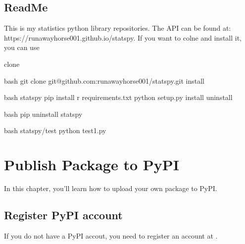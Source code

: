 \documentclass[letterpaper,12pt,english]{sphinxmanual}
\begin{document}
\section{ReadMe}
\label{\detokenize{pack:readme}}
\begin{sphinxVerbatim}[commandchars=\\\{\}]

This is my statistics python library repositories.
The API can be found at: https://runawayhorse001.github.io/statspy.
If you want to colne and install it, you can use

\PYGZhy{} clone

bash
git clone git@github.com:runawayhorse001/statspy.git
\PYGZhy{} install

bash
 statspy
pip install \PYGZhy{}r requirements.txt
python setup.py install
\PYGZhy{} uninstall

bash
pip uninstall statspy

\PYGZhy{} 

bash
 statspy/test
python test1.py
\end{sphinxVerbatim}


\chapter{Publish Package to PyPI}
\label{\detokenize{pypi:publish-package-to-pypi}}\label{\detokenize{pypi:pypi}}\label{\detokenize{pypi::doc}}
In this chapter, you’ll learn how to upload your own package to PyPI.


\section{Register PyPI account}
\label{\detokenize{pypi:register-pypi-account}}
If you do not have a PyPI accout, you need to register an account at  .
\end{document}
